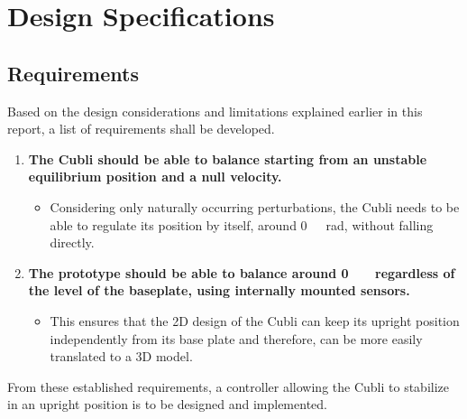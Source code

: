 \chapter{Design Specifications}\label{chap:specifications}


\section{Requirements}\label{sec:requirements}
Based on the design considerations and limitations explained earlier in this report, a list of requirements shall be developed.
%
\begin{enumerate}
\item \textbf{The Cubli should be able to balance starting from an unstable equilibrium position and a null velocity.}
  \begin{itemize}
  \item[] Considering only naturally occurring perturbations, the Cubli needs to be able to regulate its position by itself, around \si{0\ rad}, without falling directly.
  \end{itemize}

\item \textbf{The prototype should be able to balance around \si{0\ \rad} regardless of the level of the baseplate, using internally mounted sensors.}  
  \begin{itemize}
  \item[] This ensures that the 2D design of the Cubli can keep its upright position independently from its base plate and therefore, can be more easily translated to a 3D model.
  \end{itemize}
%  
%  	
\end{enumerate}
%
From these established requirements, a controller allowing the Cubli to stabilize in an upright position is to be designed and implemented.

